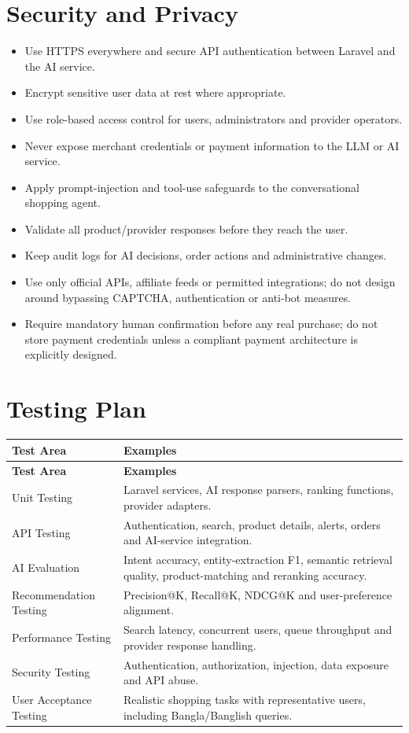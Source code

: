 \documentclass[12pt,a4paper]{article}
\begin{document}
\section{Security and Privacy}

\begin{itemize}[leftmargin=1.3cm]
    \item Use HTTPS everywhere and secure API authentication between Laravel and the AI service.
    \item Encrypt sensitive user data at rest where appropriate.
    \item Use role-based access control for users, administrators and provider operators.
    \item Never expose merchant credentials or payment information to the LLM or AI service.
    \item Apply prompt-injection and tool-use safeguards to the conversational shopping agent.
    \item Validate all product/provider responses before they reach the user.
    \item Keep audit logs for AI decisions, order actions and administrative changes.
    \item Use only official APIs, affiliate feeds or permitted integrations; do not design around bypassing
    CAPTCHA, authentication or anti-bot measures.
    \item Require mandatory human confirmation before any real purchase; do not store payment credentials unless
    a compliant payment architecture is explicitly designed.
\end{itemize}

\section{Testing Plan}

\begin{longtable}{p{3.6cm}p{9.8cm}}
\toprule
\textbf{Test Area} & \textbf{Examples} \\
\midrule
\endfirsthead
\toprule
\textbf{Test Area} & \textbf{Examples} \\
\midrule
\endhead
Unit Testing & Laravel services, AI response parsers, ranking functions, provider adapters. \\
API Testing & Authentication, search, product details, alerts, orders and AI-service integration. \\
AI Evaluation & Intent accuracy, entity-extraction F1, semantic retrieval quality, product-matching and reranking accuracy. \\
Recommendation Testing & Precision@K, Recall@K, NDCG@K and user-preference alignment. \\
Performance Testing & Search latency, concurrent users, queue throughput and provider response handling. \\
Security Testing & Authentication, authorization, injection, data exposure and API abuse. \\
User Acceptance Testing & Realistic shopping tasks with representative users, including Bangla/Banglish queries. \\
\bottomrule
\end{longtable}
\end{document}
